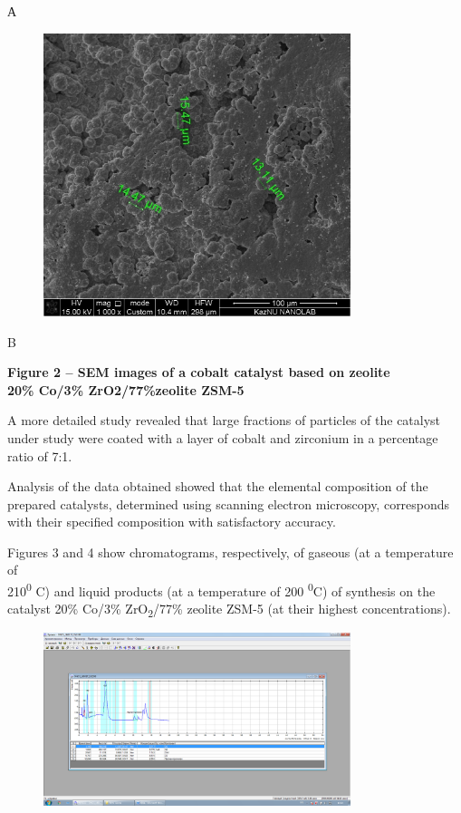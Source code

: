 А

\begin{figure}[H]
	\centering
	\includegraphics[width=0.8\textwidth]{assets/1078}
	\caption*{}
\end{figure}

B

\textbf{Figure 2 -- SEM images of a cobalt catalyst based on zeolite\\
20\% Co/3\% ZrO2/77\%zeolite ZSM-5}

A more detailed study revealed that large fractions of particles of the
catalyst under study were coated with a layer of cobalt and zirconium in
a percentage ratio of 7:1.

Analysis of the data obtained showed that the elemental composition of
the prepared catalysts, determined using scanning electron microscopy,
corresponds with their specified composition with satisfactory accuracy.

Figures 3 and 4 show chromatograms, respectively, of gaseous (at a
temperature of\\
210\textsuperscript{0} C) and liquid products (at a temperature of 200
\textsuperscript{0}C) of synthesis on the catalyst 20\% Co/3\%
ZrO\textsubscript{2}/77\% zeolite ZSM-5 (at their highest
concentrations).

\begin{figure}[H]
	\centering
	\includegraphics[width=0.8\textwidth]{assets/1079}
	\caption*{}
\end{figure}

